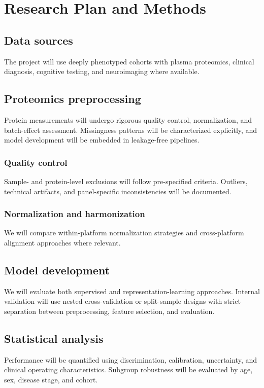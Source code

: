 \section{Research Plan and Methods}

\subsection{Data sources}

The project will use deeply phenotyped cohorts with plasma proteomics,
clinical diagnosis, cognitive testing, and neuroimaging where
available.

\subsection{Proteomics preprocessing}

Protein measurements will undergo rigorous quality control,
normalization, and batch-effect assessment. Missingness patterns will
be characterized explicitly, and model development will be embedded in
leakage-free pipelines.

\subsubsection{Quality control}

Sample- and protein-level exclusions will follow pre-specified
criteria. Outliers, technical artifacts, and panel-specific
inconsistencies will be documented.

\subsubsection{Normalization and harmonization}

We will compare within-platform normalization strategies and
cross-platform alignment approaches where relevant.

\subsection{Model development}

We will evaluate both supervised and representation-learning
approaches. Internal validation will use nested cross-validation or
split-sample designs with strict separation between preprocessing,
feature selection, and evaluation.

\subsection{Statistical analysis}

Performance will be quantified using discrimination, calibration,
uncertainty, and clinical operating characteristics. Subgroup
robustness will be evaluated by age, sex, disease stage, and cohort.
